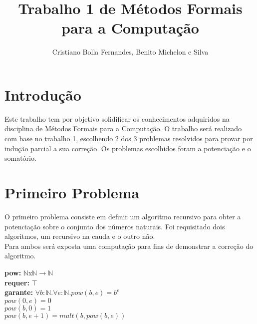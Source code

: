 \documentclass{article}
\title{Trabalho 1 de Métodos Formais para a Computação}
\author{Cristiano Bolla Fernandes, Benito Michelon e Silva}
\begin{document}
\maketitle

\section{Introdução}
Este trabalho tem por objetivo solidificar os conhecimentos adquiridos na disciplina de Métodos Formais para a Computação.
O trabalho será realizado com base no trabalho 1, escolhendo 2 dos 3 problemas resolvidos para provar por indução parcial a sua correção.
Os problemas escolhidos foram a potenciação e o somatório.

\section{Primeiro Problema}
O primeiro problema consiste em definir um algoritmo recursivo para obter a potenciação sobre o conjunto dos números naturais.
Foi requisitado dois algoritmos, um recursivo na cauda e o outro não.\\
Para ambos será exposta uma computação para fins de demonstrar a correção do algoritmo.

\noindent \textbf{pow:} $\mathbb{N}$x$\mathbb{N}$$ \rightarrow \mathbb{N}$\\
\textbf{requer:} $\top$\\
\textbf{garante:} $\forall b:\mathbb{N}. \forall e:\mathbb{N}. pow(b, e) = b^e$\\
$pow(0, e) = 0$ \\
$pow(b, 0) = 1$ \\
$pow(b, e+1) = mult(b, pow(b, e))$ \\
\end{document}
